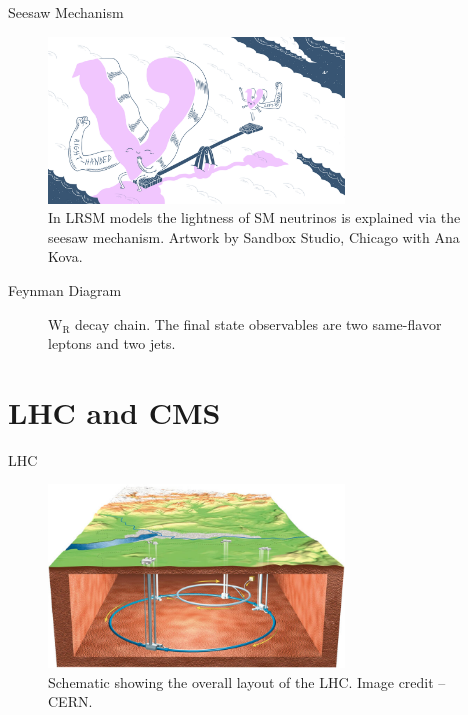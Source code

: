 \documentclass[aspectratio=169]{beamer}
\begin{document}
\begin{frame}{Seesaw Mechanism}
  \begin{figure}
    \centering
    \includegraphics[width=0.70\textwidth]{seesaw-mechanism.png}
    \caption{In LRSM models the lightness of SM neutrinos is explained
    via the seesaw mechanism. Artwork by Sandbox Studio, Chicago with Ana Kova.}
  \end{figure}
\end{frame}

\begin{frame}{Feynman Diagram}
  \begin{figure}
    \centering
    
    \caption{$\mathrm{W_R}$ decay chain. 
    The final state observables are two same-flavor leptons
    and two jets.}
  \end{figure}
\end{frame}


\section{LHC and CMS}

\begin{frame}{LHC}
  \begin{figure}
    \centering
    \includegraphics[width=0.7\textwidth]{../figures/experiment/lhc-schematic.png}
    \caption{Schematic showing the overall layout of the LHC. Image credit -- CERN.}
  \end{figure}
\end{frame}
\end{document}
